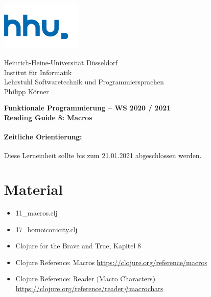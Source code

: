 \documentclass[11pt,a4paper]{article}
\theoremstyle{break}
\begin{document}
\begin{minipage}[b]{\textwidth}
\parbox[t]{5cm}{%
\includegraphics[width=4cm]{unilogo}
\hfill
}
\parbox[b]{11cm}{%
Heinrich-Heine-Universit\"at D\"usseldorf\\
Institut f\"ur Informatik\\
Lehrstuhl Softwaretechnik und Programmiersprachen\\
Philipp K\"orner
}

\end{minipage}
\begin{center}
\bf
Funktionale Programmierung -- WS 2020 / 2021\\
Reading Guide 8: Macros
\end{center}

\pagestyle{empty}

\paragraph{Zeitliche Orientierung:} Diese Lerneinheit sollte bis zum 21.01.2021 abgeschlossen werden.

\section{Material} 

\begin{itemize}
    \item 11\_macros.clj
    \item 17\_homoiconicity.clj
\item Clojure for the Brave and True, Kapitel 8
\item Clojure Reference: Macros \url{https://clojure.org/reference/macros}
\item Clojure Reference: Reader (Macro Characters) \url{https://clojure.org/reference/reader#macrochars}
\end{itemize}
\end{document}
